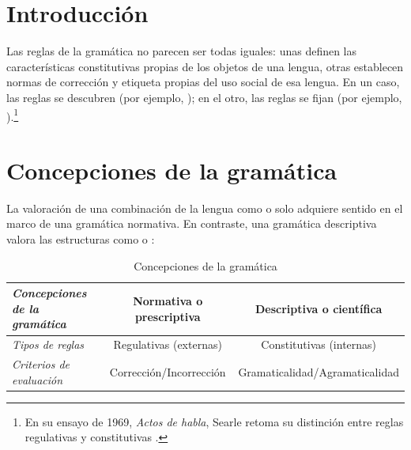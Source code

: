 
\section{Introducción}

Las reglas de la gramática no parecen ser todas iguales: unas definen las
características constitutivas propias de los objetos de una lengua, otras
establecen normas de corrección y etiqueta propias del uso social de esa
lengua. En un caso, las reglas se descubren (por ejemplo, ); en el otro, las reglas se fijan (por
ejemplo, ).\footnote{En
  su ensayo de 1969, \textit{Actos de habla}, Searle retoma su distinción entre
  reglas regulativas y constitutivas \parencite[48--49]{searle1994}.}

\section{Concepciones de la gramática}

La valoración de una combinación de la lengua como  o
 solo adquiere sentido en el marco de una gramática
normativa. En contraste, una gramática descriptiva valora las estructuras como
 o  \parencite[29]{bosque2009}:

\begin{table}[htbp]
  \centering
  \begin{tabularx}{\linewidth}{@{}>{\itshape}l C C@{}}
    \toprule
    Concepciones de la gramática & Normativa o prescriptiva & Descriptiva o científica \\
    \midrule
    Tipos de reglas          & Regulativas (externas)  & Constitutivas (internas) \\
    Criterios de evaluación  & Corrección/Incorrección & Gramaticalidad/\hspace{0pt}Agramaticalidad \\
    \bottomrule
  \end{tabularx}
  \caption{Concepciones de la gramática}
  \label{tab:concepciones}
\end{table}

